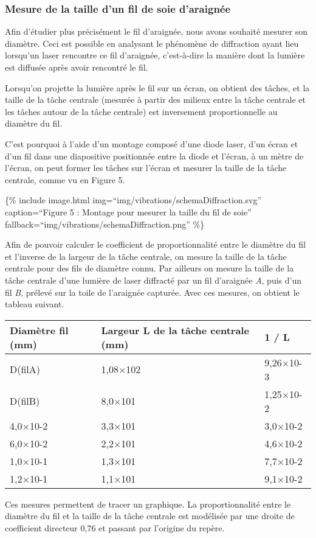 \subsubsection{Mesure de la taille d'un fil de soie
d'araignée}\label{mesure-de-la-taille-dun-fil-de-soie-daraignuxe9e}

Afin d'étudier plus précisément le fil d'araignée, nous avons souhaité
mesurer son diamètre. Ceci est possible en analysant le phénomène de
diffraction ayant lieu lorsqu'un laser rencontre ce fil d'araignée,
c'est-à-dire la manière dont la lumière est diffusée après avoir
rencontré le fil.

Lorsqu'on projette la lumière après le fil sur un écran, on obtient des
tâches, et la taille de la tâche centrale (mesurée à partir des milieux
entre la tâche centrale et les tâches autour de la tâche centrale) est
inversement proportionnelle au diamètre du fil.

C'est pourquoi à l'aide d'un montage composé d'une diode laser, d'un
écran et d'un fil dans une diapositive positionnée entre la diode et
l'écran, à un mètre de l'écran, on peut former les tâches sur l'écran et
mesurer la taille de la tâche centrale, comme vu en Figure 5.

\{\% include image.html img=``img/vibrations/schemaDiffraction.svg''
caption=``Figure 5 : Montage pour mesurer la taille du fil de soie''
fallback=``img/vibrations/schemaDiffraction.png'' \%\}

Afin de pouvoir calculer le coefficient de proportionnalité entre le
diamètre du fil et l'inverse de la largeur de la tâche centrale, on
mesure la taille de la tâche centrale pour des fils de diamètre connu.
Par ailleurs on mesure la taille de la tâche centrale d'une lumière de
laser diffracté par un fil d'araignée \emph{A}, puis d'un fil \emph{B},
prélevé sur la toile de l'araignée capturée. Avec ces mesures, on
obtient le tableau suivant.

\begin{longtable}[c]{@{}lll@{}}
\toprule
Diamètre fil (mm) & Largeur L de la tâche centrale (mm) & 1 /
L\tabularnewline
\midrule
\endhead
D(filA) & 1,08×102 & 9,26×10-3\tabularnewline
D(filB) & 8,0×101 & 1,25×10-2\tabularnewline
4,0×10-2 & 3,3×101 & 3,0×10-2\tabularnewline
6,0×10-2 & 2,2×101 & 4,6×10-2\tabularnewline
1,0×10-1 & 1,3×101 & 7,7×10-2\tabularnewline
1,2×10-1 & 1,1×101 & 9,1×10-2\tabularnewline
\bottomrule
\end{longtable}

Ces mesures permettent de tracer un graphique. La proportionnalité entre
le diamètre du fil et la taille de la tâche centrale est modélisée par
une droite de coefficient directeur 0,76 et passant par l'origine du
repère.

